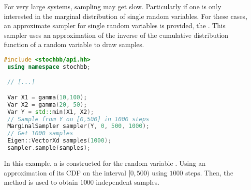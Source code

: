 For very large systems, sampling may get slow. Particularly if one is only interested
in the marginal distribution of single random variables. For these cases, an approximate sampler
for single random variables is provided, the . This sampler uses an
approximation of the inverse of the cumulative distribution function of a random variable
to draw samples.
\begin{lstlisting}[language=C++]
 #include <stochbb/api.hh>
 using namespace stochbb;

 // [...]

 Var X1 = gamma(10,100);
 Var X2 = gamma(20, 50);
 Var Y = std::min(X1, X2);
 // Sample from Y on [0,500] in 1000 steps
 MarginalSampler sampler(Y, 0, 500, 1000);
 // Get 1000 samples
 Eigen::VectorXd samples(1000);
 sampler.sample(samples);
\end{lstlisting}

In this example, a  is constructed for the random variable . Using an
approximation of its CDF on the interval $[0,500)$ using $1000$ steps. Then, the
 method is used to obtain $1000$ independent samples.


